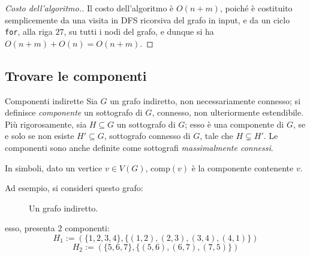 \documentclass[a4paper, 12pt]{report}
\begin{document}
    \begin{proof}[Costo dell'algoritmo.]
        Il costo dell'algoritmo è $O(n + m)$, poiché è costituito semplicemente da una visita in DFS ricorsiva del grafo in input, e da un ciclo \texttt{for}, alla riga $27$, su tutti i nodi del grafo, e dunque si ha $O(n + m) + O(n) = O(n + m)$.
    \end{proof}

    \subsection{Trovare le componenti}

    \begin{frameddefn}{Componenti indirette}
        Sia $G$ un grafo indiretto, non necessariamente connesso; si definisce \textit{componente} un sottografo di $G$, connesso, non ulteriormente estendibile. Più rigorosamente, sia $H \subseteq G$ un sottografo di $G$; esso è una componente di $G$, se e solo se non esiste $H' \subseteq G$, sottografo connesso di $G$, tale che $H \subsetneq H'$. Le componenti sono anche definite come sottografi \textit{massimalmente connessi}.

        In simboli, dato un vertice $v \in V(G)$, $\mathrm{comp}(v)$ è la componente contenente $v$.
    \end{frameddefn}

    \begin{example}
        Ad esempio, si consideri questo grafo:

        \begin{figure}[H]
            \centering
            \caption{Un grafo indiretto.}
        \end{figure}

        esso, presenta $2$ componenti: $$H_1 := (\{1, 2, 3, 4\}, \{(1, 2), (2, 3), (3, 4), (4, 1)\})$$ $$H_2 := (\{5, 6, 7\}, \{(5, 6), (6, 7), (7, 5)\})$$
    \end{example}
\end{document}

